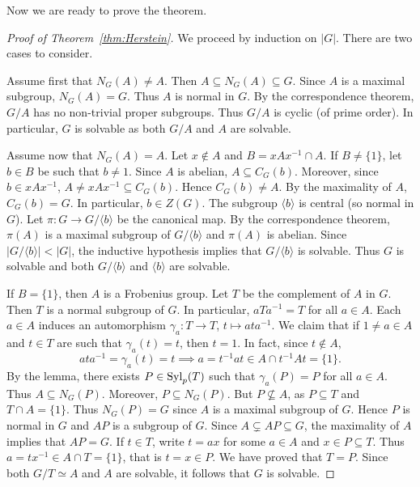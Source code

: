 Now we are ready to prove the theorem. 

\begin{proof}[Proof of Theorem~\ref{thm:Herstein}]
    We proceed by induction on $|G|$. There are two cases
    to consider. 

    Assume first that $N_G(A)\ne A$. Then $A\subseteq N_G(A)\subseteq G$. Since $A$ is a maximal subgroup, $N_G(A)=G$. Thus $A$ 
    is normal in $G$. By the correspondence theorem, $G/A$ has no non-trivial proper subgroups. Thus $G/A$ is cyclic (of prime
    order). In particular, $G$ is solvable as both 
    $G/A$ and $A$ are solvable. 

    Assume now that $N_G(A)=A$. Let $x\not\in A$ and $B=xAx^{-1}\cap A$. If $B\ne\{1\}$, let $b\in B$ be such that $b\ne 1$. 
    Since $A$ is abelian, $A\subseteq C_G(b)$. Moreover, since
    $b\in xAx^{-1}$, $A\ne xAx^{-1}\subseteq C_G(b)$. 
    Hence $C_G(b)\ne A$. By the maximality of $A$, $C_G(b)=G$. In particular, $b\in Z(G)$. The subgroup $\langle b\rangle$ 
    is central (so normal in $G$). Let $\pi\colon G\to G/\langle b\rangle$ be the canonical map. By the correspondence 
    theorem, $\pi(A)$ is a maximal subgroup of $G/\langle b\rangle$ and 
    $\pi(A)$ is abelian. Since $|G/\langle b\rangle|<|G|$, the inductive hypothesis implies that $G/\langle b\rangle$ is solvable. Thus $G$ is solvable and both 
    $G/\langle b\rangle$ and $\langle b\rangle$ are solvable. 

    If $B=\{1\}$, then $A$ is a Frobenius group. Let $T$ be 
    the complement of $A$ in $G$. Then $T$ is a normal subgroup 
    of $G$. In particular, $aTa^{-1}=T$ for all $a\in A$. 
    Each $a\in A$ induces an automorphism 
    $\gamma_a\colon T\to T$, $t\mapsto ata^{-1}$. We claim that 
    if $1\ne a\in A$ and $t\in T$ are such that 
    $\gamma_a(t)=t$, then $t=1$. In fact, since $t\not\in A$, 
    \[
    ata^{-1}=\gamma_a(t)=t\implies 
    a=t^{-1}at\in A\cap t^{-1}At=\{1\}.
    \]
    By the lemma, there exists $P\in\mathrm{Syl}_p(T)$ 
    such that $\gamma_a(P)=P$ for all $a\in A$. Thus 
    $A\subseteq N_G(P)$. Moreover, $P\subseteq N_G(P)$. But $P\not\subseteq A$, as $P\subseteq T$ and $T\cap A=\{1\}$. Thus 
    $N_G(P)=G$ since $A$ is a maximal subgroup of $G$. Hence 
    $P$ is normal in $G$ and $AP$ is a subgroup of $G$. 
    Since $A\subsetneq AP\subseteq G$, the maximality of $A$ 
    implies that $AP=G$. If $t\in T$, write
    $t=ax$ for some $a\in A$ and $x\in P\subseteq T$. Thus 
    $a=tx^{-1}\in A\cap T=\{1\}$, that is $t=x\in P$. We have proved
    that $T=P$. Since both $G/T\simeq A$ and $A$ are solvable, it follows that $G$ is solvable. 
\end{proof}

